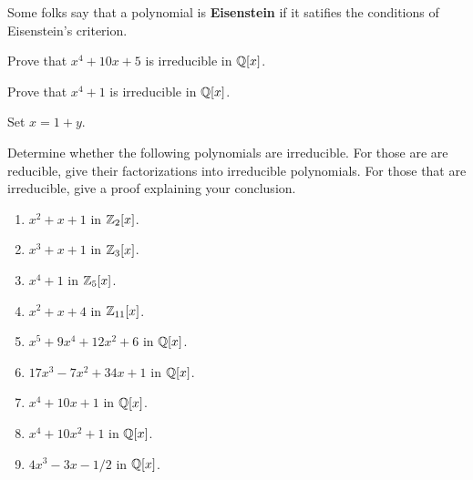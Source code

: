 \documentclass{ximera}
\begin{document}
Some folks say that a polynomial is \textbf{Eisenstein} if it satifies
the conditions of Eisenstein's criterion.


\begin{exercise}
  Prove that $x^4 + 10x + 5$ is irreducible in $\mathbb Q[x]$.
\end{exercise}



\begin{exercise}
  Prove that $x^4 + 1$ is irreducible in $\mathbb Q[x]$.
  \begin{hint}
    Set $x = 1+y$.
  \end{hint}
\end{exercise}


\begin{exercise}
  Determine whether the following polynomials are irreducible. For those
  are are reducible, give their factorizations into irreducible
  polynomials. For those that are irreducible, give a proof explaining
  your conclusion.
  \begin{enumerate}
  \item $x^2 + x +1$ in $\mathbb Z_2[x]$.
  \item $x^3 + x + 1$ in $\mathbb Z_3[x]$.
  \item $x^4+1$ in $\mathbb Z_5[x]$.
  \item $x^2 + x + 4$ in $\mathbb Z_{11}[x]$.
  \item $x^5 + 9x^4 + 12x^2 + 6$ in  $\mathbb Q[x]$.
  \item $17 x^3 - 7x^2 + 34x + 1$ in $\mathbb Q[x]$.
  \item $x^4 + 10x + 1$ in $\mathbb Q[x]$.
  \item $x^4 + 10x^2 + 1$ in $\mathbb Q[x]$.
  \item $4x^3 -3x -1/2$ in $\mathbb Q[x]$. 
\end{enumerate}
\end{exercise}
\end{document}
